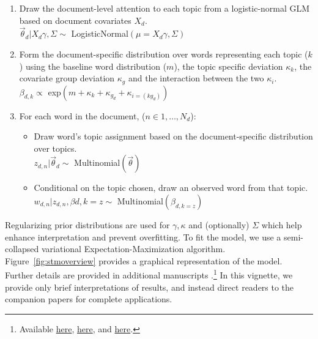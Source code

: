 \documentclass[nojss]{jss}
\begin{document}
\begin{enumerate}
\item Draw the document-level attention to each topic from a logistic-normal GLM based on document covariates $X_d$. \\
$\vec{\theta}_d | X_d\gamma, \Sigma \sim$ LogisticNormal$(\mu = X_d\gamma, \Sigma)$
\item Form the document-specific distribution over words representing each topic ($k$) using the baseline word distribution ($m$), the topic specific deviation $\kappa_k$, the covariate group deviation $\kappa_g$ and the interaction between the two $\kappa_i$.\\
$\beta_{d,k} \propto $ exp$(m + \kappa_{k} + \kappa_{g_d} + \kappa_{i=(kg_d)})$
\item For each word in the document, ($n \in 1, \dots, N_d$):
\begin{itemize}
\item Draw word's topic assignment based on the document-specific distribution over topics.\\
 $z_{d,n} | \vec{\theta}_d \sim $ Multinomial$(\vec{\theta})$
\item Conditional on the topic chosen, draw an observed word from that topic.\\
$ w_{d,n} | z_{d,n}, \beta{d,k=z} \sim $ Multinomial$(\beta_{d,k=z})$
\end{itemize}
\end{enumerate}

Regularizing prior distributions are used for $\gamma, \kappa$ and (optionally) $\Sigma$ which help enhance interpretation and prevent overfitting.  To fit the model, we use a semi-collapsed variational Expectation-Maximization algorithm.  Figure~\ref{fig:stmoverview} provides a graphical representation of the model. Further details are provided in additional manuscripts \citep{nips2013,STMEdo,ajps,TextComparative}.\footnote{Available \href{http://scholar.harvard.edu/files/dtingley/files/topicmodelsopenendedexperiments.pdf}{here}, \href{http://scholar.harvard.edu/files/bstewart/files/stmnips2013.pdf}{here}, and \href{http://scholar.harvard.edu/files/dtingley/files/comparativepoliticstext.pdf}{here}.} In this vignette, we provide only brief interpretations of results, and instead direct readers to the companion papers for complete applications.
\end{document}
